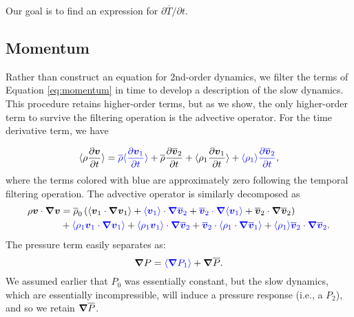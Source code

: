 Our goal is to find an expression for $\partial\overline{T}/\partial t$.


\subsection{Momentum}
Rather than construct an equation for 2nd-order dynamics, we filter the terms of Equation \ref{eq:momentum} in time to develop a description of the slow dynamics.  This procedure retains higher-order terms, but as we show, the only higher-order term to survive the filtering operation is the advective operator.  For the time derivative term, we have

\begin{equation}
\label{eq:tder}
\langle\rho\frac{\partial\boldsymbol{v}}{\partial t} \rangle = {\color{blue} \overline{\rho}\langle\frac{\partial\boldsymbol{v}_1}{\partial t}\rangle} +\overline{\rho}\frac{\partial\overline{\boldsymbol{v}}_2}{\partial t}  +\langle\rho_1\frac{\partial\boldsymbol{v}_1}{\partial t}\rangle  +{\color{blue} \langle\rho_1\rangle \frac{\partial \overline{\boldsymbol{v}}_2}{\partial t} },
\end{equation}
where the terms colored with blue are approximately zero following the temporal filtering operation.  The advective operator is similarly decomposed as
\begin{align}
\rho\boldsymbol{v}\cdot\boldsymbol{\nabla}\boldsymbol{v} &= \overline{\rho}_0\left( 
                             \langle\boldsymbol{v}_1\cdot\boldsymbol{\nabla}\boldsymbol{v}_1 \rangle 
                            +{\color{blue}\langle\boldsymbol{v}_1\rangle\cdot\boldsymbol{\nabla}\overline{\boldsymbol{v}}_2  }  
                            +{\color{blue}\overline{\boldsymbol{v}}_2\cdot\boldsymbol{\nabla}\langle\boldsymbol{v}_1\rangle  }
                            +\overline{\boldsymbol{v}}_2\cdot\boldsymbol{\nabla}\overline{\boldsymbol{v}}_2
\right)\\
&+{\color{blue} \langle\rho_1\boldsymbol{v}_1\cdot\boldsymbol{\nabla}\boldsymbol{v}_1\rangle}
                            +{\color{blue} \langle\rho_1\boldsymbol{v}_1\rangle\cdot\boldsymbol{\nabla}\overline{\boldsymbol{v}}_2}
                            +{\color{blue} \overline{\boldsymbol{v}}_2\cdot\langle\rho_1\cdot\boldsymbol{\nabla}\overline{\boldsymbol{v}}_1\rangle}
                            +{\color{blue} \langle\rho_1\rangle\overline{\boldsymbol{v}}_2\cdot\boldsymbol{\nabla}\overline{\boldsymbol{v}}_2}.
\end{align}
The pressure term easily separates as:
\begin{equation}
\boldsymbol{\nabla} P = {\color{blue} \langle \boldsymbol{\nabla} P_1 \rangle} + \boldsymbol{\nabla}\overline{P}.
\end{equation}
We assumed earlier that $P_0$ was essentially constant, but the slow dynamics, which are essentially incompressible, will induce a pressure response (i.e., a $P_2$), and so we retain $\boldsymbol{\nabla}\overline{P}$.

